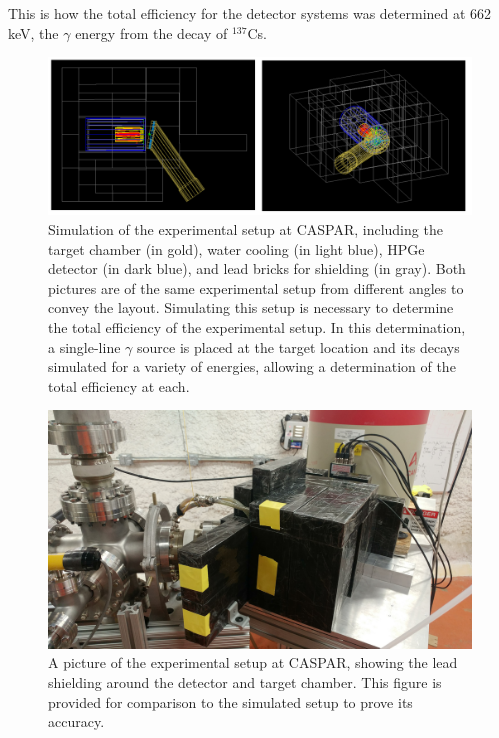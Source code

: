 \noindent This is how the total efficiency for the detector systems was determined at 662 keV, the $\gamma$ energy from the decay of $^{137}$Cs.



\begin{figure}
\centering
\includegraphics[width=\linewidth]{figures/shieldingSimulation.png}
\caption{Simulation of the experimental setup at CASPAR, including the target chamber (in gold), water cooling (in light blue), HPGe detector (in dark blue), and lead bricks for shielding (in gray). Both pictures are of the same experimental setup from different angles to convey the layout. Simulating this setup is necessary to determine the total efficiency of the experimental setup. In this determination, a single-line $\gamma$ source is placed at the target location and its decays simulated for a variety of energies, allowing a determination of the total efficiency at each.}
\label{fig: simulatedSetup}
\end{figure}


\begin{figure}
\centering
\includegraphics[width=0.8\linewidth]{figures/shieldingPicture.jpg}
\caption{A picture of the experimental setup at CASPAR, showing the lead shielding around the detector and target chamber. This figure is provided for comparison to the simulated setup to prove its accuracy. }
\label{fig: actualSetup}
\end{figure} 

